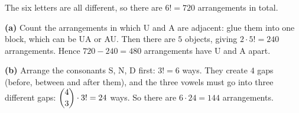 The six letters are all different, so there are $6!=720$ arrangements in total.

\textbf{(a)} Count the arrangements in which U and A are adjacent: glue them into one block, which can be UA or AU. Then there are $5$ objects, giving $2\cdot5!=240$ arrangements. Hence $720-240=\boxed{480}$ arrangements have U and A apart.

\textbf{(b)} Arrange the consonants S, N, D first: $3!=6$ ways. They create $4$ gaps (before, between and after them), and the three vowels must go into three different gaps: $\dbinom43\cdot3!=24$ ways. So there are $6\cdot24=\boxed{144}$ arrangements.
